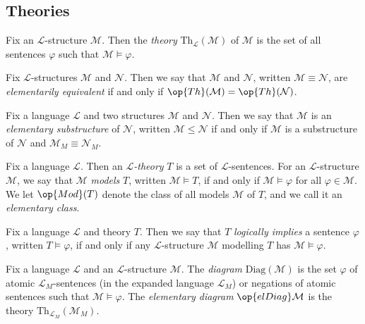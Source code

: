 \documentclass{article}
\begin{document}
\subsection{Theories}
\begin{definition}[theory]
	Fix an $\mathcal L$-structure $\mathcal M$. Then the \textit{theory} $\mathrm{Th}_{\mathcal L}(\mathcal M)$ of $\mathcal M$ is the set of all sentences $\varphi$ such that $\mathcal M\models\varphi$.
\end{definition}
\begin{definition}
	Fix $\mathcal L$-structures $\mathcal M$ and $\mathcal N$. Then we say that $\mathcal M$ and $\mathcal N$, written $\mathcal M\equiv\mathcal N$, are \textit{elementarily equivalent} if and only if $\op{Th}(\mathcal M)=\op{Th}(\mathcal N)$.
\end{definition}
\begin{definition}
	Fix a language $\mathcal L$ and two structures $\mathcal M$ and $\mathcal N$. Then we say that $\mathcal M$ is an \textit{elementary substructure} of $\mathcal N$, written $\mathcal M\le\mathcal N$ if and only if $\mathcal M$ is a substructure of $\mathcal N$ and $\mathcal M_M\equiv\mathcal N_M$.
\end{definition}
\begin{definition}[theory]
	Fix a language $\mathcal L$. Then an \textit{$\mathcal L$-theory} $T$ is a set of $\mathcal L$-sentences. For an $\mathcal L$-structure $\mathcal M$, we say that $\mathcal M$ \textit{models} $T$, written $\mathcal M\models T$, if and only if $\mathcal M\models\varphi$ for all $\varphi\in\mathcal M$. We let $\op{Mod}(T)$ denote the class of all models $\mathcal M$ of $T$, and we call it an \textit{elementary class}.
\end{definition}
\begin{definition}
	Fix a language $\mathcal L$ and theory $T$. Then we say that $T$ \textit{logically implies} a sentence $\varphi$, written $T\models\varphi$, if and only if any $\mathcal L$-structure $\mathcal M$ modelling $T$ has $\mathcal M\models\varphi$.
\end{definition}
\begin{definition}[diagram]
	Fix a language $\mathcal L$ and an $\mathcal L$-structure $\mathcal M$. The \textit{diagram} $\mathrm{Diag}(\mathcal M)$ is the set $\varphi$ of atomic $\mathcal L_M$-sentences (in the expanded language $\mathcal L_M$) or negations of atomic sentences such that $\mathcal M\models\varphi$. The \textit{elementary diagram} $\op{elDiag}\mathcal M$ is the theory $\mathrm{Th}_{\mathcal L_M}(\mathcal M_M)$.
\end{definition}
\end{document}
